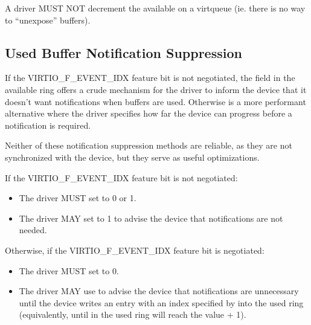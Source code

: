 A driver MUST NOT decrement the available  on a virtqueue (ie.
there is no way to ``unexpose'' buffers).

\subsection{Used Buffer Notification Suppression}\label{sec:Basic
Facilities of a Virtio Device / Virtqueues / Used Buffer Notification Suppression}

If the VIRTIO_F_EVENT_IDX feature bit is not negotiated,
the  field in the available ring offers a crude mechanism for the driver to inform
the device that it doesn't want notifications when buffers are used.  Otherwise
 is a more performant alternative where the driver
specifies how far the device can progress before a notification is
required.

Neither of these notification suppression methods are reliable, as they
are not synchronized with the device, but they serve as
useful optimizations.

If the VIRTIO_F_EVENT_IDX feature bit is not negotiated:
\begin{itemize}
\item The driver MUST set  to 0 or 1.
\item The driver MAY set  to 1 to advise
the device that notifications are not needed.
\end{itemize}

Otherwise, if the VIRTIO_F_EVENT_IDX feature bit is negotiated:
\begin{itemize}
\item The driver MUST set  to 0.
\item The driver MAY use  to advise the device that
notifications are unnecessary until the device writes an entry with an index specified by  into the used ring (equivalently, until  in the
used ring will reach the value  + 1).
\end{itemize}

